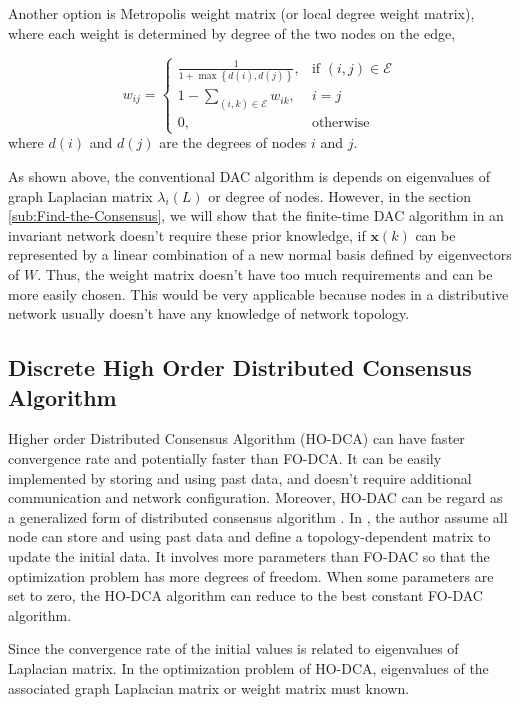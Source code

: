 Another option is Metropolis weight matrix (or local degree weight
matrix), where each weight is determined by degree of the two nodes
on the edge,

\begin{equation}
w_{ij}=\begin{cases}
\frac{1}{1+\max\left\{ d(i),d(j)\right\} }, & \mbox{if }(i,j)\in\mathit{\mathcal{E}}\\
1-\sum_{(i,k)\in\mathit{\mathcal{E}}}w_{ik}, & i=j\\
0, & \mbox{otherwise}
\end{cases}
\end{equation}
where $d(i)$ and $d(j)$ are the degrees of nodes $i$ and $j$. 

As shown above, the conventional DAC algorithm is depends on eigenvalues
of graph Laplacian matrix $\lambda_{i}\left(L\right)$ or degree of
nodes. However, in the section \eqref{sub:Find-the-Consensus}, we
will show that the finite-time DAC algorithm in an invariant network
doesn't require these prior knowledge, if $\mathbf{x}\left(k\right)$
can be represented by a linear combination of a new normal basis defined
by eigenvectors of $W$. Thus, the weight matrix doesn't
have too much requirements and can be more easily chosen. This would
be very applicable because nodes in a distributive network usually
doesn't have any knowledge of network topology. 


\subsection{\label{sub:Discrete-High-Order}Discrete High Order Distributed Consensus
Algorithm }

Higher order Distributed Consensus Algorithm (HO-DCA) can have faster
convergence rate and potentially faster than FO-DCA. It can be easily
implemented by storing and using past data, and doesn't require additional
communication and network configuration. Moreover, HO-DAC can be regard
as a generalized form of distributed consensus algorithm \cite{Xiong2010}.
In \cite{Xiong2010}, the author assume all node can store and using
past data and define a topology-dependent matrix to update the initial
data. It involves more parameters than FO-DAC so that the optimization
problem has more degrees of freedom. When some parameters are set
to zero, the HO-DCA algorithm can reduce to the best constant FO-DAC
algorithm.

Since the convergence rate of the initial values is related to eigenvalues
of Laplacian matrix. In the optimization problem of HO-DCA, eigenvalues
of the associated graph Laplacian matrix or weight matrix must known. 

